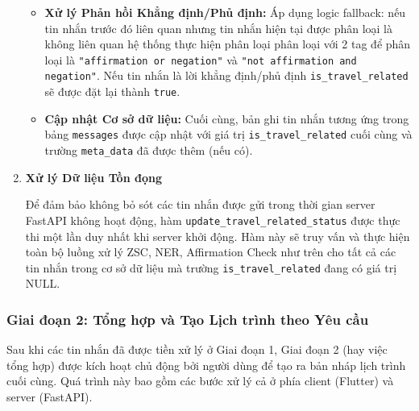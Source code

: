 \begin{enumerate}
\begin{itemize}
    \item \textbf{Xử lý Phản hồi Khẳng định/Phủ định:} Áp dụng logic fallback: nếu tin nhắn trước đó liên quan nhưng tin nhắn hiện tại được phân loại là không liên quan hệ thống thực hiện phân loại phân loại với 2 tag để phân loại là \texttt{"affirmation or negation"} và \texttt{"not affirmation and negation"}. Nếu tin nhắn là lời khẳng định/phủ định \texttt{is\_travel\_related} sẽ được đặt lại thành \texttt{true}.
    \item \textbf{Cập nhật Cơ sở dữ liệu:} Cuối cùng, bản ghi tin nhắn tương ứng trong bảng \texttt{messages} được cập nhật với giá trị \texttt{is\_travel\_related} cuối cùng và trường \texttt{meta\_data} đã được thêm (nếu có).
\end{itemize}

\item  \textbf{Xử lý Dữ liệu Tồn đọng}

\noindent Để đảm bảo không bỏ sót các tin nhắn được gửi trong thời gian server FastAPI không hoạt động, hàm \texttt{update\_travel\_related\_status} được thực thi một lần duy nhất khi server khởi động. Hàm này sẽ truy vấn và thực hiện toàn bộ luồng xử lý ZSC, NER, Affirmation Check như trên cho tất cả các tin nhắn trong cơ sở dữ liệu mà trường \texttt{is\_travel\_related} đang có giá trị NULL.

\end{enumerate}


\subsubsection{Giai đoạn 2: Tổng hợp và Tạo Lịch trình theo Yêu cầu}
\label{subsubsec:summary_phase2}

Sau khi các tin nhắn đã được tiền xử lý ở Giai đoạn 1, Giai đoạn 2 (hay việc tổng hợp) được kích hoạt chủ động bởi người dùng để tạo ra bản nháp lịch trình cuối cùng. Quá trình này bao gồm các bước xử lý cả ở phía client (Flutter) và server (FastAPI).


